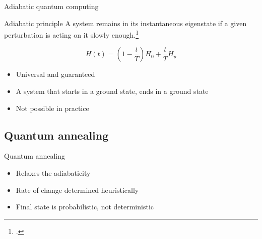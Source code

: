 \documentclass[handout]{beamer}
\begin{document}
\begin{frame}{Adiabatic quantum computing}

    \begin{alertblock}{Adiabatic principle}
        \vspace{0.1em}
        A system remains in its instantaneous eigenstate if a given perturbation is acting on it slowly enough.\footcite{born_beweis_1928}
    \end{alertblock}
    \pause
    \begin{equation*}
        H(t)=\left(1- \frac{t}{T}\right)H_0 + \frac{t}{T}H_p
    \end{equation*}

    \begin{itemize}[<+(1)->]
        \item Universal and guaranteed
        \item A system that starts in a ground state, ends in a ground state
        \item Not possible in practice
    \end{itemize}
    
\end{frame}

\subsection{Quantum annealing}

\begin{frame}{Quantum annealing}

    \begin{itemize}[<+(1)->]
        \item Relaxes the adiabaticity
        \item Rate of change determined heuristically
        \item Final state is probabilistic, not deterministic
    \end{itemize}

\end{frame}
\end{document}
